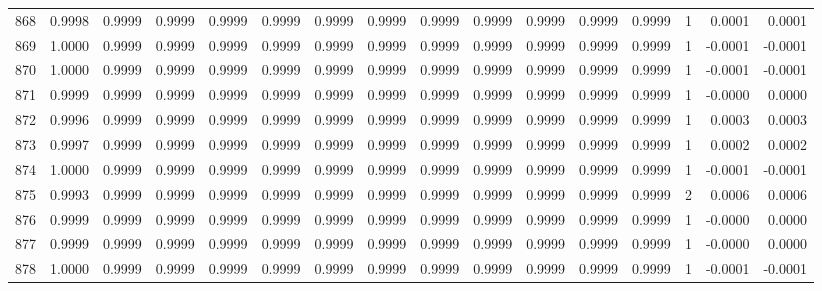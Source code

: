 \begin{tabular}{lrrrrrrrrrrrrrrr}
868 &      0.9998 &  0.9999 &  0.9999 &  0.9999 &  0.9999 &  0.9999 &  0.9999 &  0.9999 &  0.9999 &  0.9999 &   0.9999 &     0.9999 &      1 &                    0.0001 &                     0.0001 \\
869 &      1.0000 &  0.9999 &  0.9999 &  0.9999 &  0.9999 &  0.9999 &  0.9999 &  0.9999 &  0.9999 &  0.9999 &   0.9999 &     0.9999 &      1 &                   -0.0001 &                    -0.0001 \\
870 &      1.0000 &  0.9999 &  0.9999 &  0.9999 &  0.9999 &  0.9999 &  0.9999 &  0.9999 &  0.9999 &  0.9999 &   0.9999 &     0.9999 &      1 &                   -0.0001 &                    -0.0001 \\
871 &      0.9999 &  0.9999 &  0.9999 &  0.9999 &  0.9999 &  0.9999 &  0.9999 &  0.9999 &  0.9999 &  0.9999 &   0.9999 &     0.9999 &      1 &                   -0.0000 &                     0.0000 \\
872 &      0.9996 &  0.9999 &  0.9999 &  0.9999 &  0.9999 &  0.9999 &  0.9999 &  0.9999 &  0.9999 &  0.9999 &   0.9999 &     0.9999 &      1 &                    0.0003 &                     0.0003 \\
873 &      0.9997 &  0.9999 &  0.9999 &  0.9999 &  0.9999 &  0.9999 &  0.9999 &  0.9999 &  0.9999 &  0.9999 &   0.9999 &     0.9999 &      1 &                    0.0002 &                     0.0002 \\
874 &      1.0000 &  0.9999 &  0.9999 &  0.9999 &  0.9999 &  0.9999 &  0.9999 &  0.9999 &  0.9999 &  0.9999 &   0.9999 &     0.9999 &      1 &                   -0.0001 &                    -0.0001 \\
875 &      0.9993 &  0.9999 &  0.9999 &  0.9999 &  0.9999 &  0.9999 &  0.9999 &  0.9999 &  0.9999 &  0.9999 &   0.9999 &     0.9999 &      2 &                    0.0006 &                     0.0006 \\
876 &      0.9999 &  0.9999 &  0.9999 &  0.9999 &  0.9999 &  0.9999 &  0.9999 &  0.9999 &  0.9999 &  0.9999 &   0.9999 &     0.9999 &      1 &                   -0.0000 &                     0.0000 \\
877 &      0.9999 &  0.9999 &  0.9999 &  0.9999 &  0.9999 &  0.9999 &  0.9999 &  0.9999 &  0.9999 &  0.9999 &   0.9999 &     0.9999 &      1 &                   -0.0000 &                     0.0000 \\
878 &      1.0000 &  0.9999 &  0.9999 &  0.9999 &  0.9999 &  0.9999 &  0.9999 &  0.9999 &  0.9999 &  0.9999 &   0.9999 &     0.9999 &      1 &                   -0.0001 &                    -0.0001 \\

\end{tabular}
